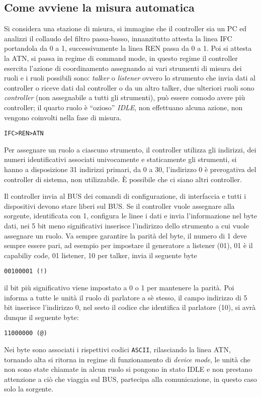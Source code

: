 \subsection{Come avviene la misura automatica}
Si considera una stazione di misura, si immagine che il controller sia un PC ed
analizzi il collaudo del filtro passa-basso,
innanzitutto attesta la linea IFC portandola da 0 a 1, successivamente la linea
REN passa da 0 a 1. Poi si attesta la ATN, si passa in regime di command mode,
in questo regime il controller esercita l'azione di coordinamento assegnando ai
vari strumenti di misura dei ruoli e i ruoli possibili sono: \textit{talker} o
\textit{listener} ovvero lo strumento che invia dati al controller o riceve
dati dal controller o da un altro talker, due ulteriori ruoli sono
\textit{controller} (non assegnabile a tutti gli strumenti), può essere comodo
avere più controller; il quarto ruolo è ``ozioso'' \textit{IDLE}, non
effettuano alcuna azione, non vengono coinvolti nella fase di misura.

\verb|IFC>REN>ATN|

Per assegnare un ruolo a ciascuno strumento, il controller utilizza gli
indirizzi, dei numeri identificativi associati univocamente e staticamente gli
strumenti, si hanno a disposizione 31 indirizzi primari, da 0 a 30, l'indirizzo
0 è prerogativa del controller di sistema, non utilizzabile. È possibile che ci
siano altri controller.

Il controller invia al BUS dei comandi di configurazione, di interfaccia e
tutti i dispositivi devono stare liberi sul BUS.
Se il controller vuole assegnare alla sorgente, identificata con 1, configura
le linee i dati e invia l'informazione nel byte dati, nei 5 bit meno
significativi inserisce l'indirizzo dello strumento a cui vuole assegnare un
ruolo. Va sempre garantire la parità del byte, il numero di 1 deve sempre
essere pari, ad esempio per impostare il generatore a listener (01), 01 è il
capabiliy code, 01 listener, 10 per talker, invia il seguente byte

\verb|00100001 (!)|

il bit più significativo viene impostato a 0 o 1 per mantenere la parità.
Poi informa a tutte le unità il ruolo di parlatore a sè stesso, il campo
indirizzo di 5 bit inserisce l'indirizzo 0, nel sesto il codice che identifica
il parlatore (10), si avrà dunque il seguente byte:

\verb|11000000 (@)|

Nei byte sono associati i rispettivi codici \verb|ASCII|, rilasciando la linea
ATN, tornando alta si ritorna in regime di funzionamento di \textit{device
mode}, le unità che non sono state chiamate in alcun ruolo si pongono in stato
IDLE e non prestano attenzione a ciò che viaggia sul BUS, partecipa alla
comunicazione, in questo caso solo la sorgente.

